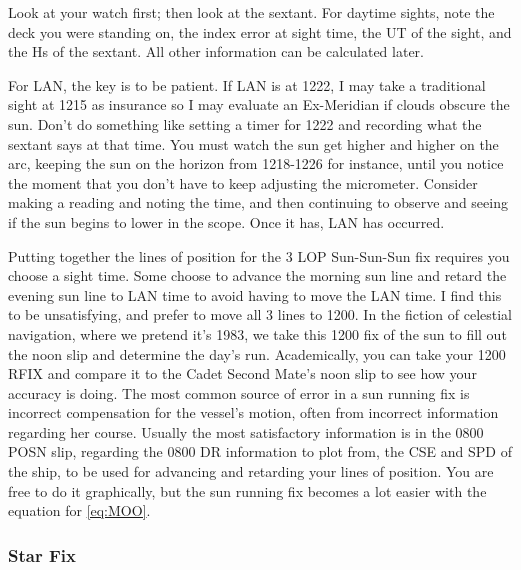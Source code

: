 \documentclass[letterpaper,12pt]{article}
\begin{document}
Look at your watch first; then look at the sextant.
For daytime sights, note the deck you were standing on, the index error at sight time, the UT of the sight, and the Hs of the sextant.
All other information can be calculated later.

For LAN, the key is to be patient. If LAN is at 1222, I may take a traditional sight at 1215 as insurance so I may evaluate an Ex-Meridian if clouds obscure the sun.
Don't do something like setting a timer for 1222 and recording what the sextant says at that time.
You must watch the sun get higher and higher on the arc, keeping the sun on the horizon from 1218-1226 for instance, until you notice the moment that you don't have to keep adjusting the micrometer.
Consider making a reading and noting the time, and then continuing to observe and seeing if the sun begins to lower in the scope.
Once it has, LAN has occurred.

Putting together the lines of position for the 3 LOP Sun-Sun-Sun fix requires you choose a sight time.
Some choose to advance the morning sun line and retard the evening sun line to LAN time to avoid having to move the LAN time.
I find this to be unsatisfying, and prefer to move all 3 lines to 1200.
In the fiction of celestial navigation, where we pretend it's 1983, we take this 1200 fix of the sun to fill out the noon slip and determine the day's run.
Academically, you can take your 1200 RFIX and compare it to the Cadet Second Mate's noon slip to see how your accuracy is doing.
The most common source of error in a sun running fix is incorrect compensation for the vessel's motion, often from incorrect information regarding her course.
Usually the most satisfactory information is in the 0800 POSN slip, regarding the 0800 DR information to plot from, the CSE and SPD of the ship, to be used for advancing and retarding your lines of position. You are free to do it graphically, but the sun running fix becomes a lot easier with the equation for \ref{eq:MOO}.
\subsubsection*{Star Fix}
\end{document}
